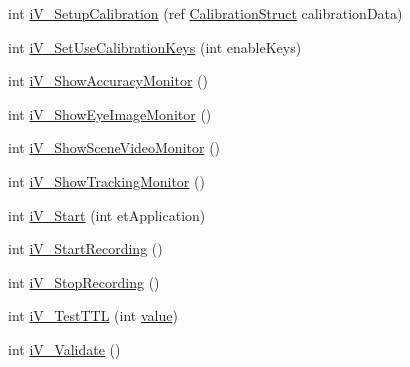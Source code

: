 \begin{DoxyCompactItemize}
\item 
int \hyperlink{class_web_analyzer_1_1_eye_tracking_1_1_eye_tracking_controller_aa61bd048ca8ecf45aa55eb8e92dadfc0}{i\+V\+\_\+\+Setup\+Calibration} (ref \hyperlink{struct_web_analyzer_1_1_eye_tracking_1_1_eye_tracking_controller_1_1_calibration_struct}{Calibration\+Struct} calibration\+Data)
\item 
int \hyperlink{class_web_analyzer_1_1_eye_tracking_1_1_eye_tracking_controller_a8991d764b97e26975f1c2f4579a79617}{i\+V\+\_\+\+Set\+Use\+Calibration\+Keys} (int enable\+Keys)
\item 
int \hyperlink{class_web_analyzer_1_1_eye_tracking_1_1_eye_tracking_controller_a051427ef0f5acb969baa9531e4ae35db}{i\+V\+\_\+\+Show\+Accuracy\+Monitor} ()
\item 
int \hyperlink{class_web_analyzer_1_1_eye_tracking_1_1_eye_tracking_controller_a04ec1cade03ec615b060a6fbd14b8d59}{i\+V\+\_\+\+Show\+Eye\+Image\+Monitor} ()
\item 
int \hyperlink{class_web_analyzer_1_1_eye_tracking_1_1_eye_tracking_controller_a2133a08cfa9abd6180695173a21043d8}{i\+V\+\_\+\+Show\+Scene\+Video\+Monitor} ()
\item 
int \hyperlink{class_web_analyzer_1_1_eye_tracking_1_1_eye_tracking_controller_aaa41b196f8226f9dd2b55b1c23c5c702}{i\+V\+\_\+\+Show\+Tracking\+Monitor} ()
\item 
int \hyperlink{class_web_analyzer_1_1_eye_tracking_1_1_eye_tracking_controller_a2185bc1fe6c8890b262e01b190b89b4f}{i\+V\+\_\+\+Start} (int et\+Application)
\item 
int \hyperlink{class_web_analyzer_1_1_eye_tracking_1_1_eye_tracking_controller_a33c90cfd826255e54e9100a3742ed299}{i\+V\+\_\+\+Start\+Recording} ()
\item 
int \hyperlink{class_web_analyzer_1_1_eye_tracking_1_1_eye_tracking_controller_a93f82b8a530bd939f0d1d764d810b2bc}{i\+V\+\_\+\+Stop\+Recording} ()
\item 
int \hyperlink{class_web_analyzer_1_1_eye_tracking_1_1_eye_tracking_controller_a9ecb73af771b7a9fd907cea2d72e228a}{i\+V\+\_\+\+Test\+T\+T\+L} (int \hyperlink{_u_i_2_h_t_m_l_resources_2js_2lib_2underscore_8min_8js_af7e1471ab89699458c4df8bb657298f6}{value})
\item 
int \hyperlink{class_web_analyzer_1_1_eye_tracking_1_1_eye_tracking_controller_aa45f7223a39f3d0d67be94fc3affa194}{i\+V\+\_\+\+Validate} ()
\end{DoxyCompactItemize}
